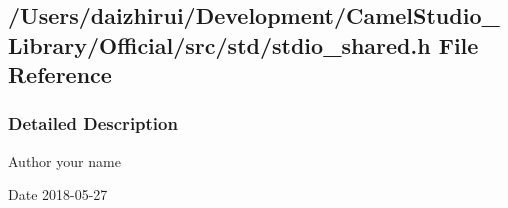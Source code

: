 \hypertarget{a00110}{}\subsection{/\+Users/daizhirui/\+Development/\+Camel\+Studio\+\_\+\+Library/\+Official/src/std/stdio\+\_\+shared.h File Reference}
\label{a00110}


\subsubsection{Detailed Description}
\begin{DoxyAuthor}{Author}
your name 
\end{DoxyAuthor}
\begin{DoxyDate}{Date}
2018-\/05-\/27 
\end{DoxyDate}
